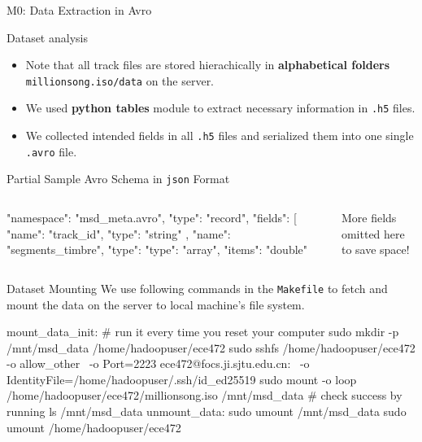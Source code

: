 \documentclass{beamer}
\begin{document}
\begin{section}{M0: Data Extraction in Avro}
\begin{frame}{Dataset analysis}
\begin{minipage}{0.4\linewidth}
\begin{itemize}
    \item Note that all track files are stored hierachically in \textbf{alphabetical folders} \texttt{millionsong.iso/data} on the server.
    \item We used \textbf{python tables} module to extract necessary information in \texttt{.h5} files.
    \item We collected intended fields in all \texttt{.h5} files and serialized them into one single \texttt{.avro} file.
\end{itemize}
\end{minipage}
    \end{frame}

    \begin{frame}[fragile]{Partial Sample Avro Schema in \texttt{json} Format}
\begin{columns}[T,onlytextwidth]

	\column{1.4\halfwidth}
\begin{mycodejson}
{
  "namespace": "msd_meta.avro",
  "type": "record",
  "fields": [
    {
      "name": "track_id",
      "type": "string"
    },
    {
      "name": "segments_timbre",
      "type": {
        "type": "array",
        "items": "double"
      }
    }
}
\end{mycodejson}

    \column{0.6\halfwidth}
    \begin{minipage}[c][\textheight]{\linewidth}  %
        \begin{center}
            More fields omitted here to save space!
        \end{center}
    \end{minipage}
\end{columns}
    \end{frame}
    
    \begin{frame}[fragile]{Dataset Mounting}
    We use following commands in the \texttt{Makefile} to fetch and mount the data on the server to local machine's file system.
\begin{bashcode}
mount_data_init:
    # run it every time you reset your computer
    sudo mkdir -p /mnt/msd_data /home/hadoopuser/ece472
    sudo sshfs /home/hadoopuser/ece472 -o allow_other \
        -o Port=2223 ece472@focs.ji.sjtu.edu.cn: \
        -o IdentityFile=/home/hadoopuser/.ssh/id_ed25519
    sudo mount -o loop /home/hadoopuser/ece472/millionsong.iso /mnt/msd_data
    # check success by running ls /mnt/msd_data
unmount_data:
    sudo umount /mnt/msd_data
    sudo umount /home/hadoopuser/ece472
\end{bashcode}
    \end{frame}
    

\end{section}
\end{document}
